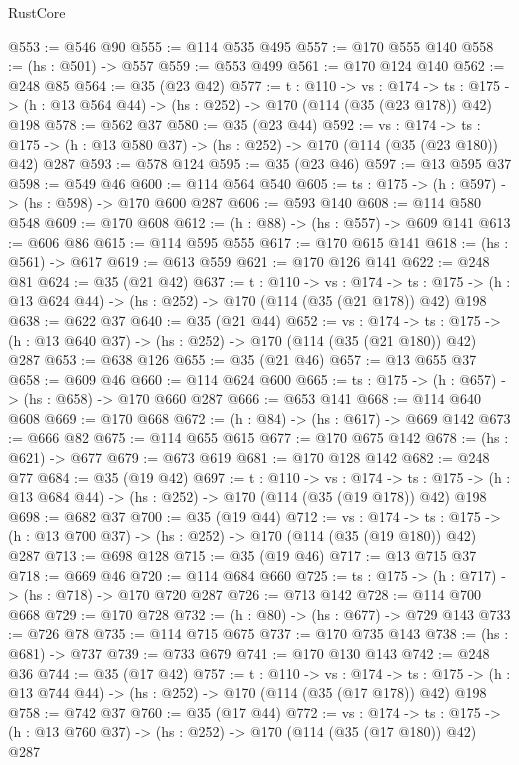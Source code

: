 \begin{lexlean}{RustCore}
\begin{coremodule}
@553 := @546 @90
@555 := @114 @535 @495
@557 := @170 @555 @140
@558 := (hs : @501) -> @557
@559 := @553 @499
@561 := @170 @124 @140
@562 := @248 @85
@564 := @35 (@23 @42)
@577 := {t : @110} ->
  {vs : @174} ->
  {ts : @175} -> (h : @13 @564 @44) -> (hs : @252) -> @170 (@114 (@35 (@23 @178)) @42) @198
@578 := @562 @37
@580 := @35 (@23 @44)
@592 := {vs : @174} ->
  {ts : @175} -> (h : @13 @580 @37) -> (hs : @252) -> @170 (@114 (@35 (@23 @180)) @42) @287
@593 := @578 @124
@595 := @35 (@23 @46)
@597 := @13 @595 @37
@598 := @549 @46
@600 := @114 @564 @540
@605 := {ts : @175} -> (h : @597) -> (hs : @598) -> @170 @600 @287
@606 := @593 @140
@608 := @114 @580 @548
@609 := @170 @608
@612 := (h : @88) -> (hs : @557) -> @609 @141
@613 := @606 @86
@615 := @114 @595 @555
@617 := @170 @615 @141
@618 := (hs : @561) -> @617
@619 := @613 @559
@621 := @170 @126 @141
@622 := @248 @81
@624 := @35 (@21 @42)
@637 := {t : @110} ->
  {vs : @174} ->
  {ts : @175} -> (h : @13 @624 @44) -> (hs : @252) -> @170 (@114 (@35 (@21 @178)) @42) @198
@638 := @622 @37
@640 := @35 (@21 @44)
@652 := {vs : @174} ->
  {ts : @175} -> (h : @13 @640 @37) -> (hs : @252) -> @170 (@114 (@35 (@21 @180)) @42) @287
@653 := @638 @126
@655 := @35 (@21 @46)
@657 := @13 @655 @37
@658 := @609 @46
@660 := @114 @624 @600
@665 := {ts : @175} -> (h : @657) -> (hs : @658) -> @170 @660 @287
@666 := @653 @141
@668 := @114 @640 @608
@669 := @170 @668
@672 := (h : @84) -> (hs : @617) -> @669 @142
@673 := @666 @82
@675 := @114 @655 @615
@677 := @170 @675 @142
@678 := (hs : @621) -> @677
@679 := @673 @619
@681 := @170 @128 @142
@682 := @248 @77
@684 := @35 (@19 @42)
@697 := {t : @110} ->
  {vs : @174} ->
  {ts : @175} -> (h : @13 @684 @44) -> (hs : @252) -> @170 (@114 (@35 (@19 @178)) @42) @198
@698 := @682 @37
@700 := @35 (@19 @44)
@712 := {vs : @174} ->
  {ts : @175} -> (h : @13 @700 @37) -> (hs : @252) -> @170 (@114 (@35 (@19 @180)) @42) @287
@713 := @698 @128
@715 := @35 (@19 @46)
@717 := @13 @715 @37
@718 := @669 @46
@720 := @114 @684 @660
@725 := {ts : @175} -> (h : @717) -> (hs : @718) -> @170 @720 @287
@726 := @713 @142
@728 := @114 @700 @668
@729 := @170 @728
@732 := (h : @80) -> (hs : @677) -> @729 @143
@733 := @726 @78
@735 := @114 @715 @675
@737 := @170 @735 @143
@738 := (hs : @681) -> @737
@739 := @733 @679
@741 := @170 @130 @143
@742 := @248 @36
@744 := @35 (@17 @42)
@757 := {t : @110} ->
  {vs : @174} ->
  {ts : @175} -> (h : @13 @744 @44) -> (hs : @252) -> @170 (@114 (@35 (@17 @178)) @42) @198
@758 := @742 @37
@760 := @35 (@17 @44)
@772 := {vs : @174} ->
  {ts : @175} -> (h : @13 @760 @37) -> (hs : @252) -> @170 (@114 (@35 (@17 @180)) @42) @287

\end{coremodule}
\end{lexlean}
